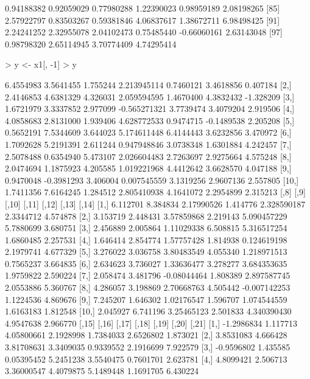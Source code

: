 \documentclass[12pt]{article}
\begin{document}
\begin{Schunk}
\begin{Soutput}
 [79]  0.94188382  0.92059029  0.77980288  1.22390023  0.98959189  2.08198265
 [85]  2.57922797  0.83503267  0.59381846  4.06837617  1.38672711  6.98498425
 [91]  2.24241252  2.32955078  2.04102473  0.75485440 -0.66060161  2.63143048
 [97]  0.98798320  2.65114945  3.70774409  4.74295414
\end{Soutput}
\begin{Sinput}
> y <- x1[, -1] 
> y
\end{Sinput}
\begin{Soutput}
           [,1]       [,2]     [,3]         [,4]      [,5]       [,6]      [,7]
 [1,] 6.4554983  3.5641455 1.755244  2.213945114 0.7460121  3.4618856  0.407184
 [2,] 2.4146853  4.6381329 4.326031  2.059594595 1.4670400  4.3832432 -1.328209
 [3,] 1.6721979  3.3337852 2.977099 -0.565271321 3.7739474  3.4079204  2.919506
 [4,] 4.0858683  2.8131000 1.939406  4.628772533 0.9474715 -0.1489538  2.205208
 [5,] 0.5652191  7.5344609 3.644023  5.174611448 6.4144443  3.6232856  3.470972
 [6,] 1.7092628  5.2191391 2.611244  0.947948846 3.0738348  1.6301884  4.242457
 [7,] 2.5078488  0.6354940 5.473107  2.026604483 2.7263697  2.9275664  4.575248
 [8,] 2.0474694  1.1875923 4.205585  1.019221968 4.4412642  3.6628570  4.047188
 [9,] 0.9470048 -0.3981293 3.406004  0.007545559 3.1319256  2.9607136  2.557805
[10,] 1.7411356  7.6164245 1.284512  2.805410938 4.1641072  2.2954899  2.315213
          [,8]     [,9]       [,10]    [,11]        [,12]     [,13]    [,14]
 [1,] 6.112701 8.384834  2.17990526 1.414776  2.328590187 2.3344712 4.574878
 [2,] 3.153719 2.448431  3.57859868 2.219143  5.090457229 5.7880699 3.680751
 [3,] 2.456889 2.005864  1.11029338 6.508815  5.316517254 1.6860485 2.257531
 [4,] 1.646414 2.854774  1.57757428 1.814938  0.124619198 2.1979741 4.677329
 [5,] 3.276022 3.036758  3.80483549 4.055340  1.218971513 0.7565237 3.664835
 [6,] 2.634623 3.736027  1.33636477 3.278277  3.684353635 1.9759822 2.590224
 [7,] 2.058474 3.481796 -0.08044464 1.808389  2.897587745 2.0553886 5.360767
 [8,] 4.286057 3.198869  2.70668763 4.505442 -0.007142253 1.1224536 4.869676
 [9,] 7.245207 1.646302  1.02176547 1.596707  1.074544559 1.6163183 1.812548
[10,] 2.045927 6.741196  3.25465123 2.501833  4.340390430 4.9547638 2.966770
           [,15]    [,16]      [,17]      [,18]     [,19]     [,20]     [,21]
 [1,] -1.2986834 1.117713 4.05800661  2.1928998 1.7384033 2.6526802  1.873021
 [2,]  3.8531083 4.666428 3.81708631  3.3409035 0.9339552 2.1916699  7.922579
 [3,] -0.9596802 1.435585 0.05395452  5.2451238 3.5540475 0.7601701  2.623781
 [4,]  4.8099421 2.506713 3.36000547  4.4079875 5.1489448 1.1691705  6.430224

\end{Soutput}
\end{Schunk}
\end{document}
